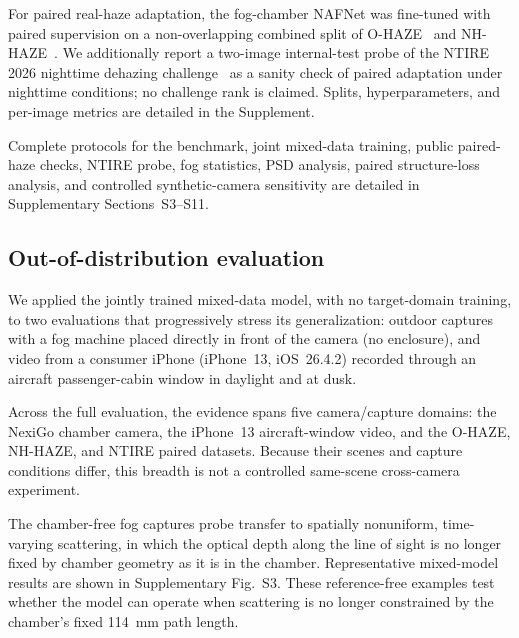 \documentclass{optica-article}
\begin{document}
For paired real-haze adaptation, the fog-chamber NAFNet was
fine-tuned with paired supervision on a non-overlapping combined split
of O-HAZE~\cite{ancuti2018ohaze} and NH-HAZE~\cite{ancuti2020nhhaze}.
We additionally report a two-image internal-test probe of the NTIRE
2026 nighttime dehazing
challenge~\cite{ancuti2026ntire,ancuti2026nt} as a sanity check
of paired adaptation under nighttime conditions; no challenge rank
is claimed. Splits, hyperparameters, and per-image metrics are
detailed in the Supplement.

Complete protocols for the benchmark, joint mixed-data training, public
paired-haze checks, NTIRE probe, fog statistics, PSD analysis,
paired structure-loss analysis, and controlled synthetic-camera sensitivity
are detailed in Supplementary Sections~S3--S11.
 
\subsection{Out-of-distribution evaluation}
\label{sec:ood}

We applied the jointly trained mixed-data model, with no target-domain
training, to two evaluations that progressively stress its
generalization: outdoor captures with a fog machine placed
directly in front of the camera (no enclosure), and video from a
consumer iPhone (iPhone~13, iOS~26.4.2) recorded through an aircraft
passenger-cabin window in daylight and at dusk.

Across the full evaluation, the evidence spans five camera/capture
domains: the NexiGo chamber camera, the iPhone~13 aircraft-window
video, and the O-HAZE, NH-HAZE, and NTIRE paired datasets. Because
their scenes and capture conditions differ, this breadth is not a
controlled same-scene cross-camera experiment.

The chamber-free fog captures probe transfer to spatially
nonuniform, time-varying scattering, in which the optical depth
along the line of sight is no longer fixed by chamber geometry as it is
in the chamber. Representative mixed-model results are shown in
Supplementary Fig.~S3. These reference-free examples test whether
the model can operate when scattering is no longer constrained by
the chamber's fixed 114~mm path length.
\end{document}
